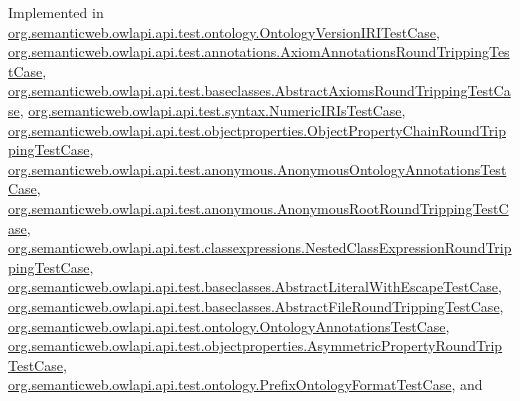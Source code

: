 Implemented in \hyperlink{classorg_1_1semanticweb_1_1owlapi_1_1api_1_1test_1_1ontology_1_1_ontology_version_i_r_i_test_case_a5d3a3a4dcb2ac44d09301e0f868861c5}{org.\-semanticweb.\-owlapi.\-api.\-test.\-ontology.\-Ontology\-Version\-I\-R\-I\-Test\-Case}, \hyperlink{classorg_1_1semanticweb_1_1owlapi_1_1api_1_1test_1_1annotations_1_1_axiom_annotations_round_tripping_test_case_a7d50bfa43b180a4024c22e1bdd14a618}{org.\-semanticweb.\-owlapi.\-api.\-test.\-annotations.\-Axiom\-Annotations\-Round\-Tripping\-Test\-Case}, \hyperlink{classorg_1_1semanticweb_1_1owlapi_1_1api_1_1test_1_1baseclasses_1_1_abstract_axioms_round_tripping_test_case_ac7974358b381c28f8d9a296c787cba06}{org.\-semanticweb.\-owlapi.\-api.\-test.\-baseclasses.\-Abstract\-Axioms\-Round\-Tripping\-Test\-Case}, \hyperlink{classorg_1_1semanticweb_1_1owlapi_1_1api_1_1test_1_1syntax_1_1_numeric_i_r_is_test_case_aaeb9ccde347bdd7c88c7e0fd97bb6c17}{org.\-semanticweb.\-owlapi.\-api.\-test.\-syntax.\-Numeric\-I\-R\-Is\-Test\-Case}, \hyperlink{classorg_1_1semanticweb_1_1owlapi_1_1api_1_1test_1_1objectproperties_1_1_object_property_chain_round_tripping_test_case_a50af1e3d7f642141bb79a3e35d98a7ec}{org.\-semanticweb.\-owlapi.\-api.\-test.\-objectproperties.\-Object\-Property\-Chain\-Round\-Tripping\-Test\-Case}, \hyperlink{classorg_1_1semanticweb_1_1owlapi_1_1api_1_1test_1_1anonymous_1_1_anonymous_ontology_annotations_test_case_a56f970fa1da2d2754d70f5f121fb3c75}{org.\-semanticweb.\-owlapi.\-api.\-test.\-anonymous.\-Anonymous\-Ontology\-Annotations\-Test\-Case}, \hyperlink{classorg_1_1semanticweb_1_1owlapi_1_1api_1_1test_1_1anonymous_1_1_anonymous_root_round_tripping_test_case_a1c7f7a40850d0171cb3905d8bb87acaa}{org.\-semanticweb.\-owlapi.\-api.\-test.\-anonymous.\-Anonymous\-Root\-Round\-Tripping\-Test\-Case}, \hyperlink{classorg_1_1semanticweb_1_1owlapi_1_1api_1_1test_1_1classexpressions_1_1_nested_class_expression_round_tripping_test_case_ad3ee92d5bb507e6e0f64343edc231a06}{org.\-semanticweb.\-owlapi.\-api.\-test.\-classexpressions.\-Nested\-Class\-Expression\-Round\-Tripping\-Test\-Case}, \hyperlink{classorg_1_1semanticweb_1_1owlapi_1_1api_1_1test_1_1baseclasses_1_1_abstract_literal_with_escape_test_case_a03de916b18b5e62a5032abd7209ba8d7}{org.\-semanticweb.\-owlapi.\-api.\-test.\-baseclasses.\-Abstract\-Literal\-With\-Escape\-Test\-Case}, \hyperlink{classorg_1_1semanticweb_1_1owlapi_1_1api_1_1test_1_1baseclasses_1_1_abstract_file_round_tripping_test_case_a69073fe9d89b007f424056054fdc4dd6}{org.\-semanticweb.\-owlapi.\-api.\-test.\-baseclasses.\-Abstract\-File\-Round\-Tripping\-Test\-Case}, \hyperlink{classorg_1_1semanticweb_1_1owlapi_1_1api_1_1test_1_1ontology_1_1_ontology_annotations_test_case_ab2970bd008c6c8bfae9f35aba9e6296f}{org.\-semanticweb.\-owlapi.\-api.\-test.\-ontology.\-Ontology\-Annotations\-Test\-Case}, \hyperlink{classorg_1_1semanticweb_1_1owlapi_1_1api_1_1test_1_1objectproperties_1_1_asymmetric_property_round_trip_test_case_aff7f93482113c674fd0ffa7f59c66c65}{org.\-semanticweb.\-owlapi.\-api.\-test.\-objectproperties.\-Asymmetric\-Property\-Round\-Trip\-Test\-Case}, \hyperlink{classorg_1_1semanticweb_1_1owlapi_1_1api_1_1test_1_1ontology_1_1_prefix_ontology_format_test_case_a3e05ef7d03b2066e66b8770950e06ff0}{org.\-semanticweb.\-owlapi.\-api.\-test.\-ontology.\-Prefix\-Ontology\-Format\-Test\-Case}, and 
